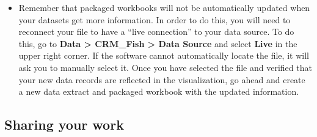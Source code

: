 \documentclass[
]{book}
\begin{document}
\begin{enumerate}
\begin{itemize}
  \item
    Remember that packaged workbooks will not be automatically updated when your datasets get more information. In order to do this, you will need to reconnect your file to have a ``live connection'' to your data source. To do this, go to \textbf{Data \textgreater{} CRM\_Fish \textgreater{} Data Source} and select \textbf{Live} in the upper right corner. If the software cannot automatically locate the file, it will ask you to manually select it. Once you have selected the file and verified that your new data records are reflected in the visualization, go ahead and create a new data extract and packaged workbook with the updated information.
  \end{itemize}
\end{enumerate}

\hypertarget{sharing-your-work}{%
\subsection{Sharing your work}\label{sharing-your-work}}
\end{document}

